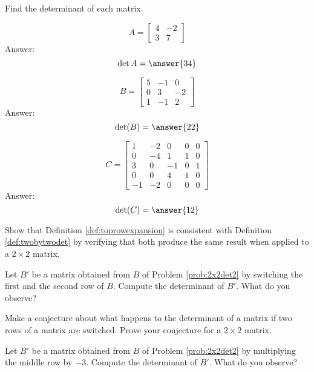 \documentclass{ximera}
\begin{document}
\begin{problem}
Find the determinant of each matrix.
  \begin{problem}\label{prob:2x2det1}
  $$A=\begin{bmatrix}4&-2\\3&7\end{bmatrix}$$
  Answer:
  $$\det{A}=\answer{34}$$
  \end{problem}
  
  \begin{problem}\label{prob:2x2det2}
  $$B=\begin{bmatrix}5&-1&0\\0&3&-2\\1&-1&2\end{bmatrix}$$
  Answer:
  $$\text{det}(B)=\answer{22}$$
  \end{problem}

  \begin{problem}\label{prob:laplace}
  $$C=\begin{bmatrix}1&-2&0&0&0\\0&-4&1&1&0\\3&0&-1&0&1\\0&0&4&1&0\\-1&-2&0&0&0\end{bmatrix}$$
   Answer:
  $$\det(C)=\answer{12}$$
 \end{problem}
\end{problem}



\begin{problem}\label{prob:toprowexp2x2}
Show that Definition \ref{def:toprowexpansion} is consistent with Definition \ref{def:twobytwodet} by verifying that both produce the same result when applied to a $2\times 2$ matrix.
\end{problem}

\begin{problem}\label{prob:detrowswitch}
Let $B'$ be a matrix obtained from $B$ of Problem \ref{prob:2x2det2} by switching the first and the second row of $B$.  Compute the determinant of $B'$.  What do you observe?
\end{problem}

\begin{problem}\label{prob:2x2rowswitchproof}
Make a conjecture about what happens to the determinant of a matrix if two rows of a matrix are switched.  Prove your conjecture for a $2\times 2$ matrix.
\end{problem}

\begin{problem}\label{prob:scalarmultrowdet} Let $B'$ be a matrix obtained from $B$ of Problem \ref{prob:2x2det2} by multiplying the middle row by $-3$.  Compute the determinant of $B'$.  What do you observe?
\end{problem}
\end{document}
